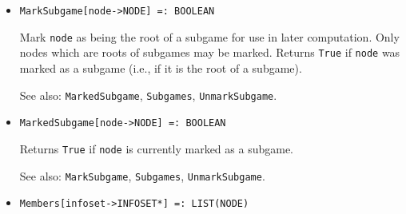 \begin{itemize}
\item{}
\protect \large \begin{verbatim}
MarkSubgame[node->NODE] =: BOOLEAN
\end{verbatim} \normalsize

\bd
Mark \verb+node+ as being the root of a subgame for use in later computation.
Only nodes which are roots of subgames may be marked.  Returns \verb+True+
if \verb+node+ was marked as a subgame (i.e., if it is the root of a subgame).
\item [See also:] \verb+MarkedSubgame+, \verb+Subgames+,
\verb+UnmarkSubgame+.
\ed





\item{}
\protect \large \begin{verbatim}
MarkedSubgame[node->NODE] =: BOOLEAN
\end{verbatim} \normalsize

\bd
Returns \verb+True+ if \verb+node+ is currently marked as a subgame. 
\item [See also:] \verb+MarkSubgame+, \verb+Subgames+, \verb+UnmarkSubgame+.
\ed



\item{}
\protect \large \begin{verbatim}
Members[infoset->INFOSET*] =: LIST(NODE)
\end{verbatim}\normalsize


\end{itemize}
